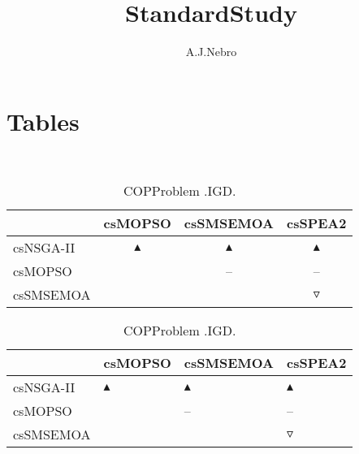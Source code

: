 \documentclass{article}
\title{StandardStudy}
\author{A.J.Nebro}
\begin{document}
\maketitle
\section{Tables}
\
\begin{table}
\caption{
COPProblem
.IGD.}
\label{Table:
COPProblem
.IGD.}
\centering
\begin{scriptsize}
\begin{tabular}{
lccc
}
\hline  & csMOPSO & csSMSEMOA & csSPEA2\\ 
\hline 
csNSGA-II
 & 
$\blacktriangle$
 & 
$\blacktriangle$
 & 
$\blacktriangle$
 \\ 
csMOPSO
 & 
  
 & 
--
 & 
--
 \\ 
csSMSEMOA
 & 
 
 & 
  
 & 
$\triangledown$
 \\ 
\hline
\end{tabular}
\end{scriptsize}
\end{table}
\begin{table}
\caption{
COPProblem 
.IGD.}
\label{Table:
COPProblem 
.IGD.}
\centering
\begin{scriptsize}
\begin{tabular}{
| l | p{0.15cm}   | p{0.15cm}   | p{0.15cm}   | 
}
\hline \multicolumn{1}{|c|}{} & \multicolumn{1}{c|}{csMOPSO} & \multicolumn{1}{c|}{csSMSEMOA} & \multicolumn{1}{c|}{csSPEA2} \\
\hline 
csNSGA-II
 & 
$\blacktriangle$
 & 
$\blacktriangle$
 & 
$\blacktriangle$
 \\ 
csMOPSO
 & 
  
 & 
--
 & 
--
 \\ 
csSMSEMOA
 & 
 
 & 
  
 & 
$\triangledown$
 \\ 
\hline
\end{tabular}
\end{scriptsize}
\end{table}
\end{document}
